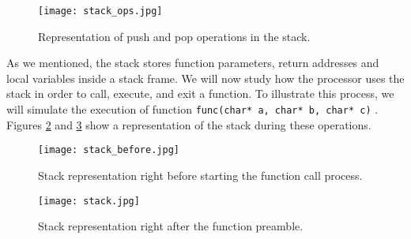 \begin{figure}[htbp]
	\centering
	\texttt{[image: stack\_ops.jpg]}
	\caption{Representation of push and pop operations in the stack.}
	\label{fig:stack_ops}
\end{figure}


As we mentioned, the stack stores function parameters, return addresses and local variables inside a stack frame. We will now study how the processor uses the stack in order to call, execute, and exit a function. To illustrate this process, we will simulate the execution of function \lstinline{func(char* a, char* b, char* c)} \lstinline{}. Figures \ref{fig:stack_before} and \ref{fig:stack} show a representation of the stack during these operations.

\begin{figure}[htbp]
	\centering
	\texttt{[image: stack\_before.jpg]}
	\caption{Stack representation right before starting the function call process.}
	\label{fig:stack_before}
\end{figure}

\begin{figure}[htbp]
	\centering
	\texttt{[image: stack.jpg]}
	\caption{Stack representation right after the function preamble.}
	\label{fig:stack}
\end{figure}

